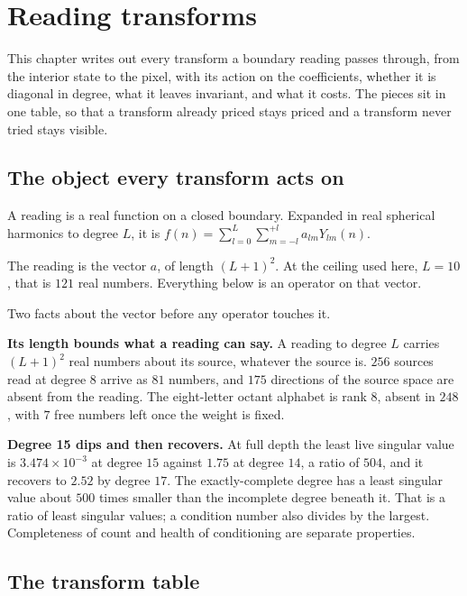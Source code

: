 \chapter{Reading transforms}

This chapter writes out every transform a boundary reading passes through, from the interior state to the pixel, with its action on the coefficients, whether it is diagonal in degree, what it leaves invariant, and what it costs. The pieces sit in one table, so that a transform already priced stays priced and a transform never tried stays visible.

\section{The object every transform acts on}

A reading is a real function on a closed boundary. Expanded in real spherical harmonics to degree \(L\), it is \(f(n) = \sum_{l=0}^{L} \sum_{m=-l}^{+l} a_{lm} Y_{lm}(n)\).

The reading is the vector \(a\), of length \((L+1)^2\). At the ceiling used here, \(L = 10\), that is \(121\) real numbers. Everything below is an operator on that vector.

Two facts about the vector before any operator touches it.

\textbf{Its length bounds what a reading can say.} A reading to degree \(L\) carries \((L+1)^2\) real numbers about its source, whatever the source is. \(256\) sources read at degree \(8\) arrive as \(81\) numbers, and \(175\) directions of the source space are absent from the reading. The eight-letter octant alphabet is rank \(8\), absent in \(248\), with \(7\) free numbers left once the weight is fixed.

\textbf{Degree 15 dips and then recovers.} At full depth the least live singular value is \(3.474 \times 10^{-3}\) at degree \(15\) against \(1.75\) at degree \(14\), a ratio of \(504\), and it recovers to \(2.52\) by degree \(17\). The exactly-complete degree has a least singular value about \(500\) times smaller than the incomplete degree beneath it. That is a ratio of least singular values; a condition number also divides by the largest. Completeness of count and health of conditioning are separate properties.

\section{The transform table}

